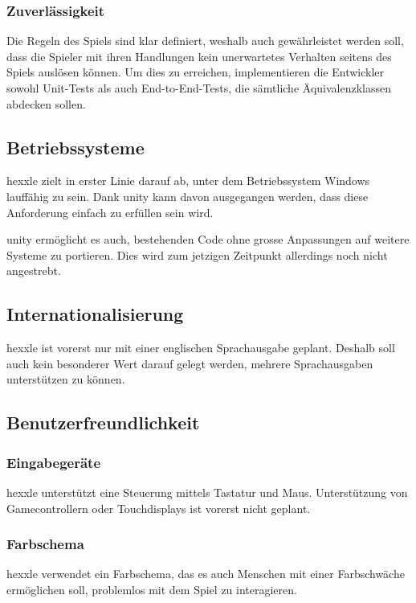 \documentclass[../main.tex]{subfiles}
\begin{document}
	\subsubsection{Zuverlässigkeit}
	\par Die Regeln des Spiels sind klar definiert, weshalb auch gewährleistet werden soll, dass die Spieler mit ihren Handlungen kein unerwartetes Verhalten seitens des Spiels auslösen können. Um dies zu erreichen, implementieren die Entwickler sowohl Unit-Tests als auch End-to-End-Tests, die sämtliche Äquivalenzklassen abdecken sollen.
	
	\subsection{Betriebssysteme}
	\par \gls{hexxle} zielt in erster Linie darauf ab, unter dem Betriebssystem Windows lauffähig zu sein. Dank \gls{unity} kann davon ausgegangen werden, dass diese Anforderung einfach zu erfüllen sein wird.
	\par \gls{unity} ermöglicht es auch, bestehenden Code ohne grosse Anpassungen auf weitere Systeme zu portieren. Dies wird zum jetzigen Zeitpunkt allerdings noch nicht angestrebt.
	
	\subsection{Internationalisierung}
	\par \gls{hexxle} ist vorerst nur mit einer englischen Sprachausgabe geplant. Deshalb soll auch kein besonderer Wert darauf gelegt werden, mehrere Sprachausgaben unterstützen zu können.
	
	\subsection{Benutzerfreundlichkeit}
	\subsubsection{Eingabegeräte}
	\par \gls{hexxle} unterstützt eine Steuerung mittels Tastatur und Maus. Unterstützung von Gamecontrollern oder Touchdisplays ist vorerst nicht geplant.
	
	\subsubsection{Farbschema}
	\par \gls{hexxle} verwendet ein Farbschema, das es auch Menschen mit einer Farbschwäche ermöglichen soll, problemlos mit dem Spiel zu interagieren.
	
\end{document}
